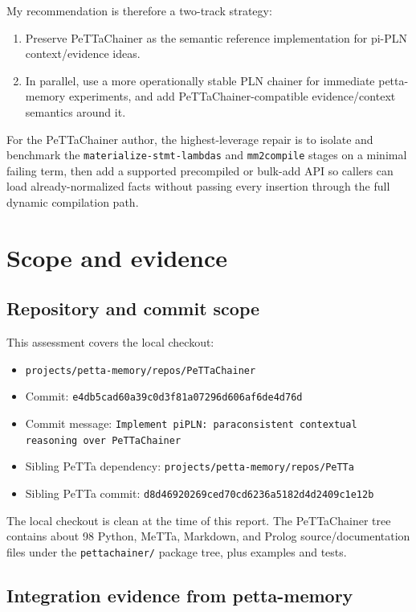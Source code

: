 \documentclass[11pt]{article}
\newcommand{\code}[1]{\texttt{#1}}
\newcommand{\fpath}[1]{\texttt{#1}}
\begin{document}
My recommendation is therefore a two-track strategy:
\begin{enumerate}
  \item Preserve PeTTaChainer as the semantic reference implementation for
  pi-PLN context/evidence ideas.
  \item In parallel, use a more operationally stable PLN chainer for immediate
  petta-memory experiments, and add PeTTaChainer-compatible evidence/context
  semantics around it.
\end{enumerate}

For the PeTTaChainer author, the highest-leverage repair is to isolate and
benchmark the \code{materialize-stmt-lambdas} and \code{mm2compile} stages on a
minimal failing term, then add a supported precompiled or bulk-add API so callers
can load already-normalized facts without passing every insertion through the
full dynamic compilation path.

\section{Scope and evidence}

\subsection{Repository and commit scope}

This assessment covers the local checkout:
\begin{itemize}
  \item \fpath{projects/petta-memory/repos/PeTTaChainer}
  \item Commit: \code{e4db5cad60a39c0d3f81a07296d606af6de4d76d}
  \item Commit message: \code{Implement piPLN: paraconsistent contextual reasoning over PeTTaChainer}
  \item Sibling PeTTa dependency: \fpath{projects/petta-memory/repos/PeTTa}
  \item Sibling PeTTa commit: \code{d8d46920269ced70cd6236a5182d4d2409c1e12b}
\end{itemize}

The local checkout is clean at the time of this report.  The PeTTaChainer tree
contains about 98 Python, MeTTa, Markdown, and Prolog source/documentation files
under the \fpath{pettachainer/} package tree, plus examples and tests.

\subsection{Integration evidence from petta-memory}
\end{document}
